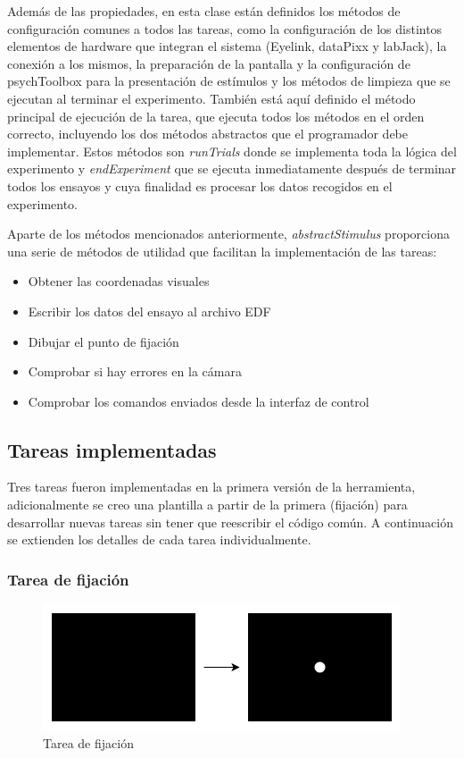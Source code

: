 \documentclass[conference]{IEEEtran}
\begin{document}
Además de las propiedades, en esta clase están definidos los métodos de configuración comunes a todos las tareas, como la configuración de los distintos elementos de hardware que integran el sistema (Eyelink, dataPixx y labJack), la conexión a los mismos, la preparación de la pantalla y la configuración de psychToolbox para la presentación de estímulos y los métodos de limpieza que se ejecutan al terminar el experimento. También está aquí definido el método principal de ejecución de la tarea, que ejecuta todos los métodos en el orden correcto, incluyendo los dos métodos abstractos que el programador debe implementar. Estos métodos son \textit{runTrials} donde se implementa toda la lógica del experimento y \textit{endExperiment} que se ejecuta inmediatamente después de terminar todos los ensayos y cuya finalidad es procesar los datos recogidos en el experimento.

Aparte de los métodos mencionados anteriormente, \textit{abstractStimulus} proporciona una serie de métodos de utilidad que facilitan la implementación de las tareas:

\begin{itemize}
	\item Obtener las coordenadas visuales
	\item Escribir los datos del ensayo al archivo EDF
	\item Dibujar el punto de fijación
	\item Comprobar si hay errores en la cámara
	\item Comprobar los comandos enviados desde la interfaz de control
\end{itemize}


\subsection{Tareas implementadas}

Tres tareas fueron implementadas en la primera versión de la herramienta, adicionalmente se creo una plantilla a partir de la primera (fijación) para desarrollar nuevas tareas sin tener que reescribir el código común. 
A continuación se extienden los detalles de cada tarea individualmente.

\subsubsection*{Tarea de fijación}

\begin{figure}[htbp]
\centerline{\includegraphics[width=\linewidth]{figures/fixation}}
\caption{Tarea de fijación}
\label{figfixTask}
\end{figure}
\end{document}
